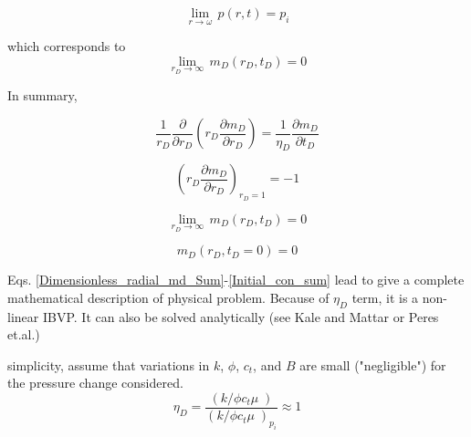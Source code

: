 \documentclass{llncs}
\numberwithin{equation}{section}
\numberwithin{figure}{section}
\numberwithin{table}{section}
\begin{document}
    \begin{equation*}
        \underset{r\to \omega }{\mathop{\lim }}\,p\left( r,t \right)={{p}_{i}}
    \end{equation*}

    which corresponds to
    \begin{equation}
        \underset{{{r}_{D}}\to \infty }{\mathop{\lim }}\,{{m}_{D}}\left( {{r}_{D}},{{t}_{D}} \right)=0
        \label{initial_condition_md}
    \end{equation}

    In summary, 

    \begin{equation}
        \frac{1}{{{r}_{D}}}\frac{\partial }{\partial {{r}_{D}}}\left( {{r}_{D}}\frac{\partial {{m}_{D}}}{\partial {{r}_{D}}} \right)=\frac{1}{{{\eta }_{D}}}\frac{\partial {{m}_{D}}}{\partial {{t}_{D}}}
        \label{Dimensionless_radial_md_Sum}
    \end{equation}

    \begin{equation}
        {{\left( {{r}_{D}}\frac{\partial {{m}_{D}}}{\partial {{r}_{D}}} \right)}_{{{r}_{D}}=1}}=-1
        \label{Boundary_1_sum}
    \end{equation}

    \begin{equation}
        \underset{{{r}_{D}}\to \infty }{\mathop{\lim }}\,{{m}_{D}}\left( {{r}_{D}},{{t}_{D}} \right)=0
        \label{Boundary_2_sum}
    \end{equation}

    \begin{equation}
        {{m}_{D}}\left( {{r}_{D}},{{t}_{D}}=0 \right)=0
        \label{Initial_con_sum}
    \end{equation}

    Eqs. \ref{Dimensionless_radial_md_Sum}-\ref{Initial_con_sum} lead to give a complete mathematical description of  physical problem. Because of ${{\eta }_{D}}$ term, it is a non-linear IBVP. It can also be solved analytically (see Kale and Mattar\cite{Kale_1980_1} or Peres et.al.\cite{Peres_1990_1})

     simplicity, assume that variations in $k$, $\phi$, $c_{t}$, and $B$ are small ("negligible") for the pressure change considered. 
     \begin{equation}
        {{\eta }_{D}}=\frac{\left( {k}/{\phi {{c}_{t}}\mu }\; \right)}{{{\left( {k}/{\phi {{c}_{t}}\mu }\; \right)}_{{{p}_{i}}}}}\approx 1
        \label{assumption}
    \end{equation}
\end{document}

